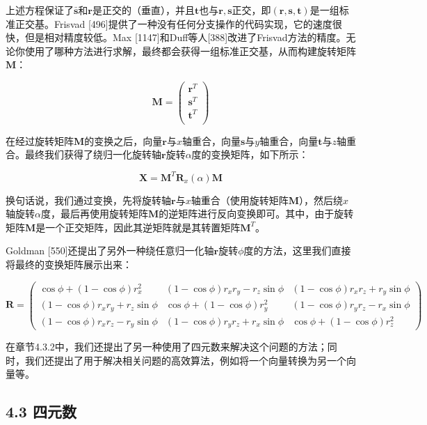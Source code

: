 \documentclass[
  paper=a4,
  ,captions=tableheading
]{scrartcl}
\begin{document}
上述方程保证了\(\mathbf{\bar{s}}\)和\(\mathbf{r}\)是正交的（垂直），并且\(\mathbf{t}\)也与\(\mathbf{r,s}\)正交，即\(\mathbf{(r,s,t)}\)是一组标准正交基。Frisvad
{[}496{]}提供了一种没有任何分支操作的代码实现，它的速度很快，但是相对精度较低。Max
{[}1147{]}和Duff等人{[}388{]}改进了Frisvad方法的精度。无论你使用了哪种方法进行求解，最终都会获得一组标准正交基，从而构建旋转矩阵\(\mathbf{M}\)：

\[
  \mathbf{M}=
  \left(
  \begin{array}{c}
      \mathbf{r}^T \\
      \mathbf{s}^T \\
      \mathbf{t}^T \\
    \end{array}
  \right)
  \tag{4.28}
\]

在经过旋转矩阵\(\mathbf{M}\)的变换之后，向量\(\mathbf{r}\)与\(x\)轴重合，向量\(\mathbf{s}\)与\(y\)轴重合，向量\(\mathbf{t}\)与\(z\)轴重合。最终我们获得了绕归一化旋转轴\(\mathbf{r}\)旋转\(\alpha\)度的变换矩阵，如下所示：

\[
  \mathbf{X} = \mathbf{M}^T \mathbf{R}_x(\alpha) \mathbf{M}
  \tag{4.29}
\]

换句话说，我们通过变换，先将旋转轴\(\mathbf{r}\)与\(x\)轴重合（使用旋转矩阵\(\mathbf{M}\)），然后绕\(x\)轴旋转\(\alpha\)度，最后再使用旋转矩阵\(\mathbf{M}\)的逆矩阵进行反向变换即可。其中，由于旋转矩阵\(\mathbf{M}\)是一个正交矩阵，因此其逆矩阵就是其转置矩阵\(\mathbf{M}^{T}\)。

Goldman
{[}550{]}还提出了另外一种绕任意归一化轴\(\mathbf{r}\)旋转\(\phi\)度的方法，这里我们直接将最终的变换矩阵展示出来：

\[
  \mathbf{R} = \left(\begin{array}{ccc}
      \cos \phi+(1-\cos \phi) r_{x}^{2}         & (1-\cos \phi) r_{x} r_{y}-r_{z} \sin \phi & (1-\cos \phi) r_{x} r_{z}+r_{y} \sin \phi \\
      (1-\cos \phi) r_{x} r_{y}+r_{z} \sin \phi & \cos \phi+(1-\cos \phi) r_{y}^{2}         & (1-\cos \phi) r_{y} r_{z}-r_{x} \sin \phi \\
      (1-\cos \phi) r_{x} r_{z}-r_{y} \sin \phi & (1-\cos \phi) r_{y} r_{z}+r_{x} \sin \phi & \cos \phi+(1-\cos \phi) r_{z}^{2}
    \end{array}\right)
  \tag{4.30}
\]

在章节4.3.2中，我们还提出了另一种使用了四元数来解决这个问题的方法；同时，我们还提出了用于解决相关问题的高效算法，例如将一个向量转换为另一个向量等。

\subsection{4.3 四元数}\label{ux56dbux5143ux6570}
\end{document}
